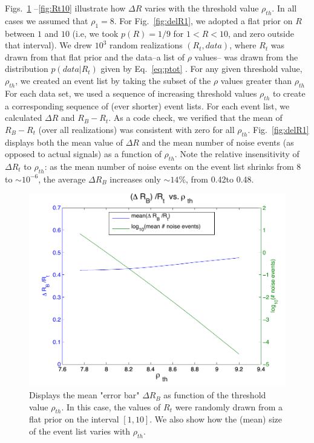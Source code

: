 \documentclass[aps,prd]{revtex4-1}
\newcommand{\curt}[1]{{\color{magenta} \bf #1}}
\begin{document}
Figs.~\ref{fig:delRb} --\ref{fig:Rt10}  illustrate how $\Delta R$ varies with the threshold value $\rho_{th}$.  In all cases we assumed that $\rho_1 = 8$.
%
For Fig.~\ref{fig:delR1}, we adopted a flat prior on $R$ between $1$ and $10$ (i.e, we took
$p(R) = 1/9$  for $1 < R <10$, and  zero outside that interval).  
We drew $10^3$ 
random realizations $(R_t, data)$, where $R_t$ was drawn from that flat prior and the data--a list of $\rho$ values-- was drawn from the distribution $p(data|R_t)$ given by Eq.~\ref{eq:ptot} .  For any given threshold value, $\rho_{th}$, we created an event list by taking the subset of the $\rho$ values
greater than $\rho_{th}$  For each data set, we used a sequence of increasing threshold  values $\rho_{th}$ to create a corresponding sequence of (ever shorter)  event lists.  For each event list, we calculated $\Delta R$ and $R_B - R_t$.
As a code check, we verified that the mean of $R_B - R_t$ (over all realizations) was consistent with zero for all $\rho_{th}$.  Fig.~\ref{fig:delR1} displays both the mean value of $\Delta R$ and the mean number of noise events (as opposed to actual signals) as a function of $\rho_{th}$. 
Note the relative insensitivity of  $\Delta R_t$ to $\rho_{th}$:  as the mean
number of noise events on the event list shrinks from $8$ to $\sim 10^{-6}$, 
the average $\Delta R_B$ increases only $\sim 14\%$, from 0.42to 0.48.

\begin{figure}
\includegraphics[width=\columnwidth]{delRb}
\caption{\label{fig:delRb} Displays the mean "error bar" $\Delta R_B$ as function of the threshold value $\rho_{th}$.  In this case, the values of $R_t$ were randomly drawn from a flat prior on the interval $[1,10]$.  We also show how the (mean) size of the event list varies with $\rho_{th}$.}
\end{figure}
\end{document}
